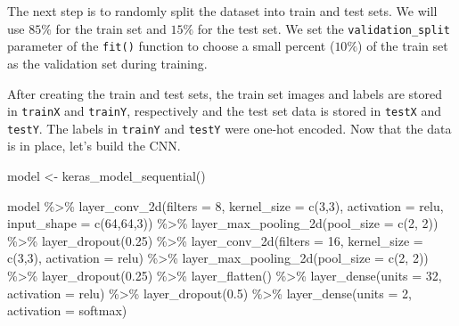 \documentclass[
  11pt,
]{krantz}
\newenvironment{Shaded}{\begin{snugshade}}{\end{snugshade}}
\newcommand{\AttributeTok}[1]{\textcolor[rgb]{0.61,0.61,0.61}{#1}}
\newcommand{\DecValTok}[1]{\textcolor[rgb]{0.06,0.06,0.06}{#1}}
\newcommand{\FloatTok}[1]{\textcolor[rgb]{0.06,0.06,0.06}{#1}}
\newcommand{\FunctionTok}[1]{\textcolor[rgb]{0,0,0}{#1}}
\newcommand{\NormalTok}[1]{#1}
\newcommand{\OtherTok}[1]{\textcolor[rgb]{0.37,0.37,0.37}{#1}}
\newcommand{\SpecialCharTok}[1]{\textcolor[rgb]{0,0,0}{#1}}
\newcommand{\StringTok}[1]{\textcolor[rgb]{0.5,0.5,0.5}{#1}}
\begin{document}
The next step is to randomly split the dataset into train and test sets. We will use \(85\%\) for the train set and \(15\%\) for the test set. We set the \texttt{validation\_split} parameter of the \texttt{fit()} function to choose a small percent (\(10\%\)) of the train set as the validation set during training.

After creating the train and test sets, the train set images and labels are stored in \texttt{trainX} and \texttt{trainY}, respectively and the test set data is stored in \texttt{testX} and \texttt{testY}. The labels in \texttt{trainY} and \texttt{testY} were one-hot encoded. Now that the data is in place, let's build the CNN.

\begin{Shaded}
\begin{Highlighting}[]
\NormalTok{model }\OtherTok{\textless{}{-}} \FunctionTok{keras\_model\_sequential}\NormalTok{()}

\NormalTok{model }\SpecialCharTok{\%\textgreater{}\%}
  \FunctionTok{layer\_conv\_2d}\NormalTok{(}\AttributeTok{filters =} \DecValTok{8}\NormalTok{,}
                \AttributeTok{kernel\_size =} \FunctionTok{c}\NormalTok{(}\DecValTok{3}\NormalTok{,}\DecValTok{3}\NormalTok{),}
                \AttributeTok{activation =} \StringTok{\textquotesingle{}relu\textquotesingle{}}\NormalTok{,}
                \AttributeTok{input\_shape =} \FunctionTok{c}\NormalTok{(}\DecValTok{64}\NormalTok{,}\DecValTok{64}\NormalTok{,}\DecValTok{3}\NormalTok{)) }\SpecialCharTok{\%\textgreater{}\%}
  \FunctionTok{layer\_max\_pooling\_2d}\NormalTok{(}\AttributeTok{pool\_size =} \FunctionTok{c}\NormalTok{(}\DecValTok{2}\NormalTok{, }\DecValTok{2}\NormalTok{)) }\SpecialCharTok{\%\textgreater{}\%}
  \FunctionTok{layer\_dropout}\NormalTok{(}\FloatTok{0.25}\NormalTok{) }\SpecialCharTok{\%\textgreater{}\%}
  \FunctionTok{layer\_conv\_2d}\NormalTok{(}\AttributeTok{filters =} \DecValTok{16}\NormalTok{,}
                \AttributeTok{kernel\_size =} \FunctionTok{c}\NormalTok{(}\DecValTok{3}\NormalTok{,}\DecValTok{3}\NormalTok{),}
                \AttributeTok{activation =} \StringTok{\textquotesingle{}relu\textquotesingle{}}\NormalTok{) }\SpecialCharTok{\%\textgreater{}\%}
  \FunctionTok{layer\_max\_pooling\_2d}\NormalTok{(}\AttributeTok{pool\_size =} \FunctionTok{c}\NormalTok{(}\DecValTok{2}\NormalTok{, }\DecValTok{2}\NormalTok{)) }\SpecialCharTok{\%\textgreater{}\%}
  \FunctionTok{layer\_dropout}\NormalTok{(}\FloatTok{0.25}\NormalTok{) }\SpecialCharTok{\%\textgreater{}\%}
  \FunctionTok{layer\_flatten}\NormalTok{() }\SpecialCharTok{\%\textgreater{}\%}
  \FunctionTok{layer\_dense}\NormalTok{(}\AttributeTok{units =} \DecValTok{32}\NormalTok{, }\AttributeTok{activation =} \StringTok{\textquotesingle{}relu\textquotesingle{}}\NormalTok{) }\SpecialCharTok{\%\textgreater{}\%}
  \FunctionTok{layer\_dropout}\NormalTok{(}\FloatTok{0.5}\NormalTok{) }\SpecialCharTok{\%\textgreater{}\%}
  \FunctionTok{layer\_dense}\NormalTok{(}\AttributeTok{units =} \DecValTok{2}\NormalTok{, }\AttributeTok{activation =} \StringTok{\textquotesingle{}softmax\textquotesingle{}}\NormalTok{)}
\end{Highlighting}
\end{Shaded}
\end{document}
